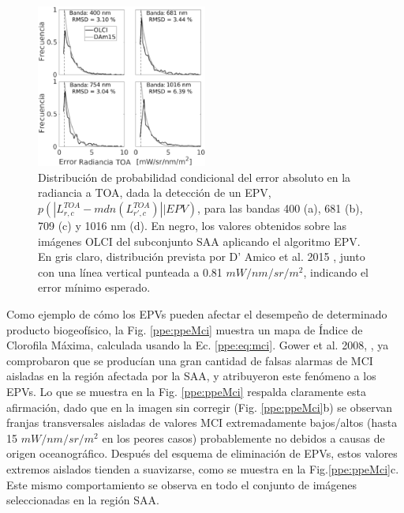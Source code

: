     \begin{figure}
    \centering
    \includegraphics[width=0.5\textwidth]{ppe/figures/ppeHists}
    \caption[Distribución de probabilidad condicional del error absoluto en la radiancia a TOA, dada la detección de un EPV.]{Distribución de probabilidad condicional del error absoluto en la radiancia a TOA, dada la detección de un EPV, $p(| L^{TOA}_{r,c}-mdn(L^{TOA}_{r',c})| |EPV) $, para las bandas 400 (a), 681 (b), 709 (c) y 1016 nm (d). En negro, los valores obtenidos sobre las imágenes OLCI del subconjunto SAA aplicando el algoritmo EPV. En gris claro, distribución prevista por D' Amico et al. 2015 \cite{damico2015}, junto con una línea vertical punteada a 0.81 $mW/nm/sr/m^{2}$, indicando el error mínimo esperado.}
    \label{ppe:ppeHists}
    \end{figure}

    Como ejemplo de cómo los EPVs pueden afectar el desempeño de determinado producto biogeofísico, la Fig. \ref{ppe:ppeMci} muestra un mapa de Índice de Clorofila Máxima, calculada usando la Ec. \ref{ppe:eq:mci}. Gower et al. 2008, \cite{gower2008b}, ya comprobaron que se producían una gran cantidad de falsas alarmas de MCI aisladas en la región afectada por la SAA, y atribuyeron este fenómeno a los EPVs. Lo que se muestra en la Fig. \ref{ppe:ppeMci} respalda claramente esta afirmación, dado que en la imagen sin corregir (Fig. \ref{ppe:ppeMci}b) se observan franjas transversales aisladas de valores MCI extremadamente bajos/altos (hasta 15 $mW/nm/sr/m^{2}$ en los peores casos) probablemente no debidos a causas de origen oceanográfico. Después del esquema de eliminación de EPVs, estos valores extremos aislados tienden a suavizarse, como se muestra en la Fig.\ref{ppe:ppeMci}c. Este mismo comportamiento se observa en todo el conjunto de imágenes seleccionadas en la región SAA.

